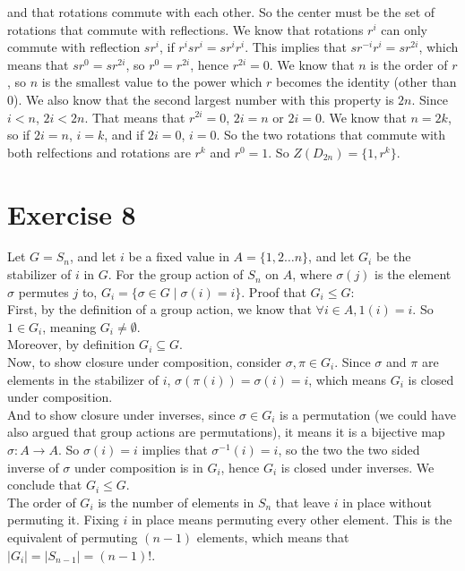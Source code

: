 \documentclass[12pt]{article}
\begin{document}
\begin{enumerate}[label=\textbf{\alph*.}]
            and that rotations commute with each other.
            So the center must be the set of rotations that commute with
            reflections.
            We know that rotations $r^i$ can only commute with
            reflection $sr^i$,
            if $r^isr^i = sr^ir^i$.
            This implies that $sr^{-i}r^i = sr^{2i}$,
            which means that $sr^{0} = sr^{2i}$,
            so $r^{0} = r^{2i}$,
            hence $r^{2i} = 0$.
            We know that $n$ is the order of $r$,
            so $n$ is the smallest value to the power which $r$
            becomes the identity (other than 0).
            We also know that the second largest number with this
            property is $2n$.
            Since $i < n$, $2i < 2n$.
            That means that $r^{2i} = 0$, $2i = n$ or $2i = 0$.
            We know that $n = 2k$, so if $2i = n$, $i = k$,
            and if $2i = 0$, $i = 0$.
            So the two rotations that commute with both relfections
            and rotations are $r^k$ and $r^0 = 1$.
            So $Z(D_{2n}) = \{1, r^k\}$.
    \end{enumerate}


    \section*{Exercise 8}
    Let $G = S_n$, and let $i$ be a fixed value in $A = \{1, 2 \dots n\}$,
    and let $G_i$ be the stabilizer of $i$ in $G$.
    For the group action of $S_n$ on $A$, where $\sigma(j)$
    is the element $\sigma$ permutes $j$ to,
    $G_i = \{\sigma \in G \mid \sigma(i) = i\}$.
    Proof that $G_i \leqslant G$: \\
    First, by the definition of a group action,
    we know that $\forall i \in A, 1(i) = i$.
    So $1 \in G_i$,
    meaning $G_i \neq \emptyset$. \\
    Moreover, by definition $G_i \subseteq G$. \\
    Now, to show closure under composition,
    consider $\sigma, \pi \in G_i$.
    Since $\sigma$ and $\pi$ are elements in the stabilizer of $i$,
    $\sigma(\pi(i)) = \sigma(i) = i$,
    which means $G_i$ is closed under composition. \\
    And to show closure under inverses,
    since $\sigma \in G_i$ is a permutation
    (we could have also argued that group actions are permutations),
    it means it is a bijective map $\sigma: A \to A$.
    So $\sigma(i) = i$ implies that $\sigma^{-1}(i) = i$,
    so the two the two sided inverse of $\sigma$ under composition
    is in $G_i$,
    hence $G_i$ is closed under inverses.
    We conclude that $G_i \leqslant G$. \\
    The order of $G_i$ is the number of elements in $S_n$
    that leave $i$ in place without permuting it.
    Fixing $i$ in place means permuting every other element.
    This is the equivalent of permuting $(n-1)$ elements,
    which means that $|G_i| = |S_{n-1}| = (n-1)!$.
\end{document}
